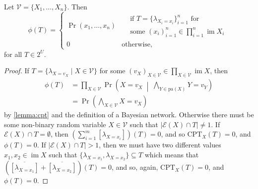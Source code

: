 \documentclass[accepted]{uai2021}
\DeclareMathOperator{\im}{im}
\newenvironment{customlemma}[1]
{\renewcommand\theinnercustomlemma{#1}\innercustomlemma}
{\endinnercustomlemma}
\begin{document}
\begin{customlemma}{2} \label{lemma:full_distribution}
  Let $\mathcal{V} = \{X_1, \dots, X_n\}$. Then
  \[
    \phi(T) =
    \begin{cases}
      \Pr(x_1, \dots, x_n) &
      \begin{aligned}
        &\text{if } T = \{ \lambda_{X_i=x_i} \}_{i = 1}^n \text{ for} \\
        &\text{some } \textstyle (x_i)_{i=1}^n \in \prod_{i=1}^n \im X_i
      \end{aligned} \\
      0 & \text{otherwise,}
    \end{cases}
  \]
  for all $T \in 2^U$.
\end{customlemma}
\begin{proof}
  If $T = \{ \lambda_{X=v_X} \mid X \in \mathcal{V} \}$ for some $(v_X)_{X
    \in \mathcal{V}} \in \prod_{X \in \mathcal{V}} \im X$, then
  \begin{align*}
    \phi(T) &= \prod_{X \in \mathcal{V}} \Pr \left( X=v_X \;\middle|\; \bigwedge_{Y \in \mathrm{pa}(X)} Y=v_Y \right) \\
            &= \Pr \left( \bigwedge_{X \in \mathcal{V}} X=v_X \right)
  \end{align*}
  by \cref{lemma:cpt} and the definition of a Bayesian network. Otherwise there
  must be some non-binary random variable $X \in \mathcal{V}$ such that
  $|\mathcal{E}(X) \cap T| \ne 1$. If $\mathcal{E}(X) \cap T = \emptyset$, then
  $\left( \sum_{i=1}^m [\lambda_{X = x_i}] \right)(T) = 0$, and so
  $\mathrm{CPT}_X(T) = 0$, and $\phi(T) = 0$. If $|\mathcal{E}(X) \cap T| > 1$,
  then we must have two different values $x_1, x_2 \in \im X$ such that
  $\{\lambda_{X=x_1}, \lambda_{X=x_2} \} \subseteq T$ which means that
  $(\overline{[\lambda_{X=x_1}]} + \overline{[\lambda_{X=x_2}]})(T) = 0$, and
  so, again, $\mathrm{CPT}_X(T) = 0$, and $\phi(T) = 0$.
\end{proof}
\end{document}
